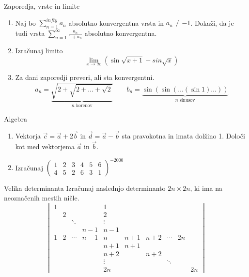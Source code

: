 \begin{frame}{Zaporedja, vrste in limite}
	\begin{enumerate}
		\item 
		Naj bo $\sum_{n=1}^{infty} a_n$ absolutno konvergentna vrsta in $a_n \ne -1$.
		Dokaži, da je tudi vrsta $\sum_{n=1}^\infty \frac{a_n}{1+a_n}$
		absolutno konvergentna.

		\item
		Izračunaj limito
		$$\lim_{x \to\infty}\left(\sin\sqrt{x+1}-sin\sqrt{x}\right)$$

		\item
		Za dani zaporedji preveri, ali sta konvergentni.
		$$
		a_n = \underbrace{\sqrt{2+\sqrt{2+\dots+\sqrt{2}}}}_{n\text{ korenov}} \qquad
		b_n = \underbrace{\sin(\sin(\dots(\sin 1)\dots))}_{n\text{ sinusov}}
		$$
		
	\end{enumerate}
\end{frame}

\begin{frame}{Algebra}
	\begin{enumerate}
		\item
		Vektorja $\vec{c} = \vec{a} + 2\vec{b}$ in $\vec{d} = \vec{a} - \vec{b}$
		sta pravokotna in imata dolžino 1. Določi kot med vektorjema $\vec{a}$ in $\vec{b}$.
		\item 
		Izračunaj $\begin{pmatrix}
			1 & 2 & 3 & 4 & 5 & 6 \\
			4 & 5 & 2 & 6 & 3 & 1
		\end{pmatrix}^{-2000}$
	\end{enumerate}
\end{frame}

\begin{frame}{Velika determinanta}
	Izračunaj naslednjo determinanto $2n \times 2n$, ki ima na neoznačenih mestih ničle.
	 $$
	 \begin{vmatrix}
		1 & 	&			& 		& 1 		&		& 		& 		& & \\
		  & 2   &			&		& 2 		&		& 		&		& & \\
		  &		& \ddots	&		& \vdots	&		&		&		& & \\
		  &		&			& n-1	& n-1		&		&		&		& & \\
		1 & 2	& \cdots	& n-1	& n			& n+1	& n+2	&		\cdots & 2n \\
 		  &		&			&		& n+1		& n+1	& 		&		& & \\
		  &		&			&		& n+2		& 		& n+2	&		& & \\
		  &		&			&		& \vdots	&		& 		&		\ddots & \\
          &		&			&		& 2n		&		&		&		& & 2n
	 \end{vmatrix}
	 $$

\end{frame}

